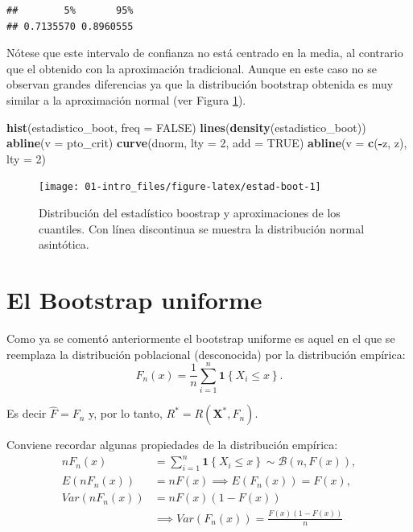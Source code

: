 \documentclass[]{book}
\newenvironment{Shaded}{\begin{snugshade}}{\end{snugshade}}
\newcommand{\KeywordTok}[1]{\textcolor[rgb]{0.13,0.29,0.53}{\textbf{#1}}}
\newcommand{\DataTypeTok}[1]{\textcolor[rgb]{0.13,0.29,0.53}{#1}}
\newcommand{\DecValTok}[1]{\textcolor[rgb]{0.00,0.00,0.81}{#1}}
\newcommand{\OtherTok}[1]{\textcolor[rgb]{0.56,0.35,0.01}{#1}}
\newcommand{\OperatorTok}[1]{\textcolor[rgb]{0.81,0.36,0.00}{\textbf{#1}}}
\newcommand{\NormalTok}[1]{#1}
\theoremstyle{definition}
\theoremstyle{definition}
\theoremstyle{definition}
\theoremstyle{remark}
\begin{document}
\begin{verbatim}
##        5%       95% 
## 0.7135570 0.8960555
\end{verbatim}

Nótese que este intervalo de confianza no está centrado en la media, al
contrario que el obtenido con la aproximación tradicional. Aunque en
este caso no se observan grandes diferencias ya que la distribución
bootstrap obtenida es muy similar a la aproximación normal (ver Figura
\ref{fig:estad-boot}).

\begin{Shaded}
\begin{Highlighting}[]
\KeywordTok{hist}\NormalTok{(estadistico_boot, }\DataTypeTok{freq =} \OtherTok{FALSE}\NormalTok{)}
\KeywordTok{lines}\NormalTok{(}\KeywordTok{density}\NormalTok{(estadistico_boot))}
\KeywordTok{abline}\NormalTok{(}\DataTypeTok{v =}\NormalTok{ pto_crit)}
\KeywordTok{curve}\NormalTok{(dnorm, }\DataTypeTok{lty =} \DecValTok{2}\NormalTok{, }\DataTypeTok{add =} \OtherTok{TRUE}\NormalTok{)}
\KeywordTok{abline}\NormalTok{(}\DataTypeTok{v =} \KeywordTok{c}\NormalTok{(}\OperatorTok{-}\NormalTok{z, z), }\DataTypeTok{lty =} \DecValTok{2}\NormalTok{)}
\end{Highlighting}
\end{Shaded}

\begin{figure}[!htb]

{\centering \texttt{[image: 01-intro\_files/figure-latex/estad-boot-1]} 

}

\caption{Distribución del estadístico boostrap y aproximaciones de los cuantiles. Con línea discontinua se muestra la distribución normal asintótica.}\label{fig:estad-boot}
\end{figure}

\section{El Bootstrap uniforme}\label{cap1-unif}

Como ya se comentó anteriormente el bootstrap uniforme es aquel en el
que se reemplaza la distribución poblacional (desconocida) por la
distribución empírica:
\[F_n\left( x \right) =\frac{1}{n}\sum_{i=1}^{n}\mathbf{1}\left\{ X_i\leq x\right\}.\]

Es decir \(\hat{F}=F_n\) y, por lo tanto,
\(R^{\ast}=R\left( \mathbf{X}^{\ast},F_n \right)\).

Conviene recordar algunas propiedades de la distribución empírica:
\[\begin{aligned}
nF_n\left( x \right) &= \sum_{i=1}^{n}\mathbf{1}\left\{ X_i\leq x\right\}
\sim \mathcal{B}\left( n,F\left( x \right) \right), \\
E\left( nF_n\left( x \right) \right) &= nF\left( x \right) \implies E\left(
F_n\left( x \right) \right) =F\left( x \right), \\
Var\left( nF_n\left( x \right) \right) &=  nF\left( x \right) \left(
1-F\left( x \right) \right) \\
&\implies  Var\left( F_n\left( x \right) \right) =\frac{F\left( x \right) \left( 1-F\left( x \right) \right)}{n}
\end{aligned}\]
\end{document}
